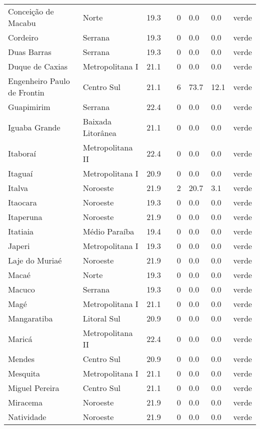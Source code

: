 \begin{longtable}{l|lllllll}
  Conceição de Macabu & Norte & 19.3 &  & 0 & 0.0 & 0.0 & verde \\ 
  Cordeiro & Serrana & 19.3 &  & 0 & 0.0 & 0.0 & verde \\ 
  Duas Barras & Serrana & 19.3 &  & 0 & 0.0 & 0.0 & verde \\ 
  Duque de Caxias & Metropolitana I & 21.1 &  & 0 & 0.0 & 0.0 & verde \\ 
  Engenheiro Paulo de Frontin & Centro Sul & 21.1 &  & 6 & 73.7 & 12.1 & verde \\ 
  Guapimirim & Serrana & 22.4 &  & 0 & 0.0 & 0.0 & verde \\ 
  Iguaba Grande & Baixada Litorânea & 21.1 &  & 0 & 0.0 & 0.0 & verde \\ 
  Itaboraí & Metropolitana II & 22.4 &  & 0 & 0.0 & 0.0 & verde \\ 
  Itaguaí & Metropolitana I & 20.9 &  & 0 & 0.0 & 0.0 & verde \\ 
  Italva & Noroeste & 21.9 &  & 2 & 20.7 & 3.1 & verde \\ 
  Itaocara & Noroeste & 19.3 &  & 0 & 0.0 & 0.0 & verde \\ 
  Itaperuna & Noroeste & 21.9 &  & 0 & 0.0 & 0.0 & verde \\ 
  Itatiaia & Médio Paraíba & 19.4 &  & 0 & 0.0 & 0.0 & verde \\ 
  Japeri & Metropolitana I & 19.3 &  & 0 & 0.0 & 0.0 & verde \\ 
  Laje do Muriaé & Noroeste & 21.9 &  & 0 & 0.0 & 0.0 & verde \\ 
  Macaé & Norte & 19.3 &  & 0 & 0.0 & 0.0 & verde \\ 
  Macuco & Serrana & 19.3 &  & 0 & 0.0 & 0.0 & verde \\ 
  Magé & Metropolitana I & 21.1 &  & 0 & 0.0 & 0.0 & verde \\ 
  Mangaratiba & Litoral Sul & 20.9 &  & 0 & 0.0 & 0.0 & verde \\ 
  Maricá & Metropolitana II & 22.4 &  & 0 & 0.0 & 0.0 & verde \\ 
  Mendes & Centro Sul & 20.9 &  & 0 & 0.0 & 0.0 & verde \\ 
  Mesquita & Metropolitana I & 21.1 &  & 0 & 0.0 & 0.0 & verde \\ 
  Miguel Pereira & Centro Sul & 21.1 &  & 0 & 0.0 & 0.0 & verde \\ 
  Miracema & Noroeste & 21.9 &  & 0 & 0.0 & 0.0 & verde \\ 
  Natividade & Noroeste & 21.9 &  & 0 & 0.0 & 0.0 & verde \\ 

\end{longtable}

